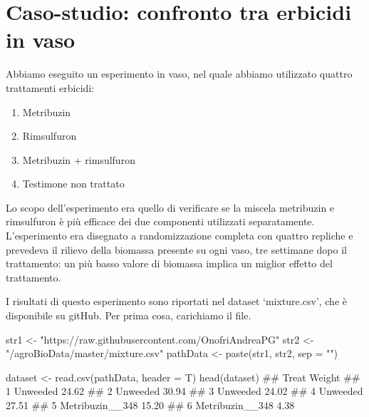 \documentclass[a4paper,12pt,oneside]{book}
\providecommand{\tightlist}{%
  \setlength{\itemsep}{0pt}\setlength{\parskip}{0pt}}
\newenvironment{Shaded}{}{}
\newcommand{\KeywordTok}[1]{#1}
\newcommand{\DataTypeTok}[1]{#1}
\newcommand{\StringTok}[1]{#1}
\newcommand{\CommentTok}[1]{#1}
\newcommand{\NormalTok}[1]{#1}
\begin{document}
\hypertarget{caso-studio-confronto-tra-erbicidi-in-vaso}{%
\section{Caso-studio: confronto tra erbicidi in vaso}\label{caso-studio-confronto-tra-erbicidi-in-vaso}}

Abbiamo eseguito un esperimento in vaso, nel quale abbiamo utilizzato quattro trattamenti erbicidi:

\begin{enumerate}
\def\labelenumi{\arabic{enumi}.}
\tightlist
\item
  Metribuzin
\item
  Rimsulfuron
\item
  Metribuzin + rimsulfuron
\item
  Testimone non trattato
\end{enumerate}

Lo scopo dell'esperimento era quello di verificare se la miscela metribuzin e rimsulfuron è più efficace dei due componenti utilizzati separatamente. L'esperimento era disegnato a randomizzazione completa con quattro repliche e prevedeva il rilievo della biomassa presente su ogni vaso, tre settimane dopo il trattamento: un più basso valore di biomassa implica un miglior effetto del trattamento.

I risultati di questo esperimento sono riportati nel dataset `mixture.csv', che è disponibile su gitHub. Per prima cosa, carichiamo il file.

\vspace{12pt}

\begin{Shaded}
\begin{Highlighting}[]
\NormalTok{str1 <-}\StringTok{ "https://raw.githubusercontent.com/OnofriAndreaPG"}
\NormalTok{str2 <-}\StringTok{ "/agroBioData/master/mixture.csv"}
\NormalTok{pathData <-}\StringTok{ }\KeywordTok{paste}\NormalTok{(str1, str2, }\DataTypeTok{sep =} \StringTok{""}\NormalTok{)}

\NormalTok{dataset <-}\StringTok{ }\KeywordTok{read.csv}\NormalTok{(pathData, }\DataTypeTok{header =}\NormalTok{ T)}
\KeywordTok{head}\NormalTok{(dataset)}
\CommentTok{##             Treat Weight}
\CommentTok{## 1        Unweeded  24.62}
\CommentTok{## 2        Unweeded  30.94}
\CommentTok{## 3        Unweeded  24.02}
\CommentTok{## 4        Unweeded  27.51}
\CommentTok{## 5 Metribuzin__348  15.20}
\CommentTok{## 6 Metribuzin__348   4.38}
\end{Highlighting}
\end{Shaded}
\end{document}
